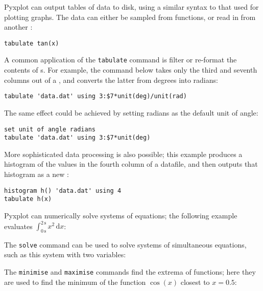 
Pyxplot can output tables of data to disk, using a similar syntax to that used
for plotting graphs. The data can either be sampled from functions, or read in
from another \datafile:

\begin{verbatim}
tabulate tan(x)
\end{verbatim}

\noindent A common application of the {\tt tabulate} command is filter or
re-format the contents of \datafile s. For example, the command below takes
only the third and seventh columns out of a \datafile, and converts the latter
from degrees into radians:

\begin{verbatim}
tabulate 'data.dat' using 3:$7*unit(deg)/unit(rad)
\end{verbatim}

\noindent The same effect could be achieved by setting radians as the default
unit of angle:

\begin{verbatim}
set unit of angle radians
tabulate 'data.dat' using 3:$7*unit(deg)
\end{verbatim}

\noindent More sophisticated data processing is also possible; this example
produces a histogram of the values in the fourth column of a datafile, and then
outputs that histogram as a new \datafile:

\begin{verbatim}
histogram h() 'data.dat' using 4
tabulate h(x)
\end{verbatim}


Pyxplot can numerically solve systems of equations; the following example
evaluates $\int_{0\,\mathrm{s}}^{2\,\mathrm{s}} x^2\,\mathrm{d}x$:

\vspace{3mm}

\vspace{3mm}

\noindent The {\tt solve} command can be used to solve systems of simultaneous equations, such as this system with two variables:

\vspace{3mm}

\vspace{3mm}

\noindent The {\tt minimise} and {\tt maximise} commands find the extrema of functions; here they are used to find the minimum of the function $\cos(x)$ closest to $x=0.5$:

